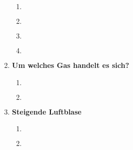 \documentclass[11pt,letterpaper]{article}
\begin{document}
\begin{enumerate}
\begin{enumerate}
      \item
        \begin{align*}
        \end{align*}

      \item
        \begin{align*}
        \end{align*}

      \item
        \begin{align*}
        \end{align*}

      \item
        \begin{align*}
        \end{align*}
    \end{enumerate}

\newpage
  \item \textbf{Um welches Gas handelt es sich? }
    \begin{enumerate}
      \item
        \begin{align*}
        \end{align*}

      \item
        \begin{align*}
        \end{align*}
    \end{enumerate}

  \item \textbf{Steigende Luftblase}
    \begin{enumerate}
      \item
        \begin{align*}
        \end{align*}

      \item
        \begin{align*}
        \end{align*}
    \end{enumerate}

\end{enumerate}
\end{document}
